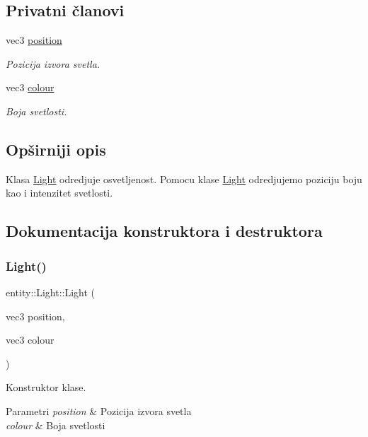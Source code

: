 \subsection*{Privatni članovi}
\begin{DoxyCompactItemize}
\item 
vec3 \hyperlink{classentity_1_1Light_a1c8e3d9bb8ba4f1c4e1c370cfa5ebe15}{position}
\begin{DoxyCompactList}\small\item\em Pozicija izvora svetla. \end{DoxyCompactList}\item 
vec3 \hyperlink{classentity_1_1Light_a637c529cb886fb092ea0775b4821671d}{colour}
\begin{DoxyCompactList}\small\item\em Boja svetlosti. \end{DoxyCompactList}\end{DoxyCompactItemize}


\subsection{Opširniji opis}
Klasa \hyperlink{classentity_1_1Light}{Light} odredjuje osvetljenost. Pomocu klase \hyperlink{classentity_1_1Light}{Light} odredjujemo poziciju boju kao i intenzitet svetlosti. 

\subsection{Dokumentacija konstruktora i destruktora}
\mbox{\label{classentity_1_1Light_a803705cea46720608058911bb426fa57}} 
\subsubsection{\texorpdfstring{Light()}{Light()}}
{\footnotesize\ttfamily entity\+::\+Light\+::\+Light (\begin{DoxyParamCaption}\item[{vec3}]{position,  }\item[{vec3}]{colour }\end{DoxyParamCaption})}



Konstruktor klase. 


\begin{DoxyParams}{Parametri}
{\em position} & Pozicija izvora svetla \\
\hline
{\em colour} & Boja svetlosti \\
\hline
\end{DoxyParams}
\mbox{\label{classentity_1_1Light_a7d0af8d0bea98a97c4e61c23b562f6fa}} 
